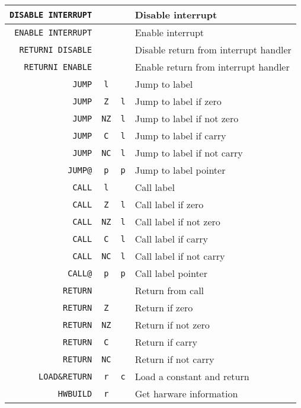 \begin{table}[H]
\begin{tabular}{| r | c | c | l |}
\verb|DISABLE INTERRUPT|&\verb||&\verb||& Disable interrupt \\ \hline
\verb|ENABLE INTERRUPT|&\verb||&\verb||& Enable interrupt \\ \hline
\verb|RETURNI DISABLE|&\verb||&\verb||& Disable return from interrupt handler \\ \hline
\verb|RETURNI ENABLE|&\verb||&\verb||& Enable return from interrupt handler \\ \hline

\verb|JUMP|&\verb|l|&\verb||& Jump to label \\ \hline
\verb|JUMP|&\verb|Z|&\verb|l|& Jump to label if zero \\ \hline
\verb|JUMP|&\verb|NZ|&\verb|l|& Jump to label if not zero \\ \hline
\verb|JUMP|&\verb|C|&\verb|l|& Jump to label if carry \\ \hline
\verb|JUMP|&\verb|NC|&\verb|l|& Jump to label if not carry \\ \hline
\verb|JUMP@|&\verb|p|&\verb|p|& Jump to label pointer\\ \hline

\verb|CALL|&\verb|l|&\verb||& Call label \\ \hline
\verb|CALL|&\verb|Z|&\verb|l|& Call label if zero \\ \hline
\verb|CALL|&\verb|NZ|&\verb|l|& Call label if not zero \\ \hline
\verb|CALL|&\verb|C|&\verb|l|& Call label if carry \\ \hline
\verb|CALL|&\verb|NC|&\verb|l|& Call label if not carry \\ \hline
\verb|CALL@|&\verb|p|&\verb|p|& Call label pointer \\ \hline

\verb|RETURN|&\verb||&\verb||& Return from call \\ \hline
\verb|RETURN|&\verb|Z|&\verb||& Return if zero \\ \hline
\verb|RETURN|&\verb|NZ|&\verb||& Return if not zero  \\ \hline
\verb|RETURN|&\verb|C|&\verb||& Return if carry \\ \hline
\verb|RETURN|&\verb|NC|&\verb||& Return if not carry \\ \hline

\verb|LOAD&RETURN|&\verb|r|&\verb|c|& Load a constant and return \\ \hline

\verb|HWBUILD|&\verb|r|&\verb||& Get harware information\\ \hline
\end{tabular}
\end{table}


